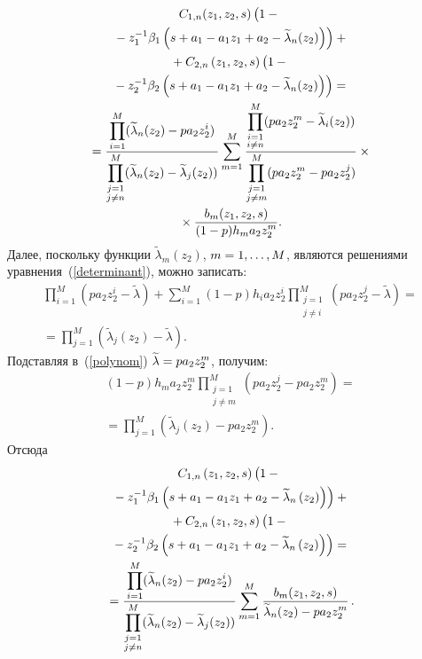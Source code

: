 \begin{multicols}{2}
\noindent
\begin{multline*}
C_{1,n}(z_1,z_2,s)\left(
\vphantom{\tilde{\lambda}_n^{-1}}
1-{}\right.\\
\left.{}-z_1^{-1}\beta_1
\left(s+a_1-a_1 z_1+a_2-\widetilde{\lambda}_n(z_2)\right)\right)+{}\\
{}+C_{2,n}\left(z_1,z_2,s\right)
\left(
\vphantom{\tilde{\lambda}_n^{-1}}
1-{}\right.\\
\left.{}-z_2^{-1}\beta_2\left(s+a_1-a_1 z_1+a_2-\widetilde{\lambda}_n(z_2)\right)\right)={}\\
{}=\fr{\prod\limits_{i=1}^M(\widetilde{\lambda}_n(z_2)-pa_2 z_2^i)}
{\prod\limits_{\substack{j=1\\j\neq n}}^M
(\widetilde{\lambda}_n(z_2)-\widetilde{\lambda}_j(z_2))}
\sum\limits_{m=1}^M
\fr{\prod\limits_{\substack{i=1\\i\neq n}}^M
(pa_2 z_2^m-\widetilde{\lambda}_i(z_2))}
{\prod\limits_{\substack{j=1\\j\neq m}}^M(pa_2 z_2^m-pa_2 z_2^j)}\times{}\\
{}\times
\fr{b_m(z_1,z_2,s)}{(1-p)h_m a_2 z_2^m}.
\end{multline*}
Далее, поскольку функции $\widetilde{\lambda}_m(z_2)$, $m\hm=1,\ldots,M$, 
являются решениями уравнения~(\ref{determinant}), можно записать:
\begin{multline}
\prod_{i=1}^M(pa_2 z_2^i-\widetilde{\lambda})+
\sum\limits_{i=1}^M
(1-p)h_i a_2 z_2^i
\prod\limits_{\substack{j=1\\j\neq i}}^M\left(pa_2 z_2^j-\widetilde{\lambda}\right)={}\\
{}=
\prod_{j=1}^M\left(\widetilde{\lambda}_j(z_2)-\widetilde{\lambda}\right).
\label{polynom}
\end{multline}
Подставляя в~(\ref{polynom}) $\widetilde{\lambda}\hm=pa_2 z_2^m$, получим:
\begin{multline*}
(1-p)h_m a_2 z_2^m
\prod\limits_{\substack{j=1\\j\neq m}}^M
\left(pa_2 z_2^j-pa_2 z_2^m\right)={}\\
{}=\prod_{j=1}^M
\left(\widetilde{\lambda}_j(z_2)-pa_2 z_2^m\right).
\end{multline*}
Отсюда
\begin{multline}
C_{1,n}\left(z_1,z_2,s\right)\left(
\vphantom{\tilde{\lambda}_n^{-1}}
1-{}\right.\\
\left.{}-z_1^{-1}\beta_1
\left(s+a_1-a_1 z_1+a_2-\widetilde{\lambda}_n\left(z_2\right)\right)\right)+{}\\
{}+C_{2,n}\left(z_1,z_2,s\right)\left(
\vphantom{\tilde{\lambda}_n^{-1}}
1-{}\right.\\
\left.{}-z_2^{-1}\beta_2\left(s+a_1-a_1 z_1+a_2-\widetilde{\lambda}_n\left(
z_2\right)\right)\right)={}\\
{}=\fr{\prod\limits_{i=1}^M(\widetilde{\lambda}_n(z_2)-pa_2 z_2^i)}
{\prod\limits_{\substack{j=1\\j\neq n}}^M(\widetilde{\lambda}_n(z_2)-
\widetilde{\lambda}_j(z_2))}
\sum\limits_{m=1}^M
\fr{b_m(z_1,z_2,s)}{\widetilde{\lambda}_n(z_2)-pa_2 z_2^m}\,.
\label{C}
\end{multline}


\end{multicols}
